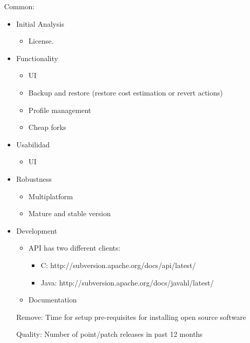 \documentclass[11pt]{scrartcl}
\begin{document}
Common:
\begin{itemize}

    \item Initial Analysis
        \begin{itemize}
            \item License.
        \end{itemize}

    \item Functionality
        \begin{itemize}
            \item UI 
            \item Backup and restore (restore cost estimation or revert actions)
            \item Profile management
            \item Cheap forks
        \end{itemize}

    \item Usabilidad
        \begin{itemize}
            \item UI
        \end{itemize}
    
    \item Robustness
        \begin{itemize}
            \item Multiplatform
            \item Mature and stable version
        \end{itemize}

    \item Development
        \begin{itemize}
            \item API has two different clients:
            \begin{itemize}
                \item C: http://subversion.apache.org/docs/api/latest/ 
                \item Java: http://subversion.apache.org/docs/javahl/latest/
            \end{itemize}
            \item Documentation
        \end{itemize}

Remove: Time for setup pre-requisites for installing open source software 

Quality: Number of point/patch releases in past 12 months


\end{itemize}
\end{document}
